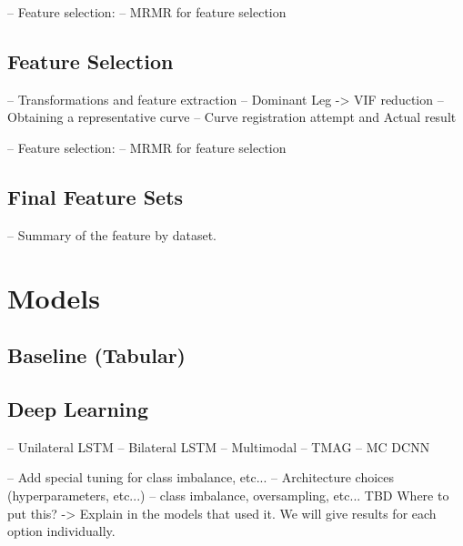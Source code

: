 -- Feature selection:
    -- MRMR for feature selection

\subsection{Feature Selection}\label{subsec:method-feature-selection}
-- Transformations and feature extraction
    -- Dominant Leg -> VIF reduction
    -- Obtaining a representative curve
        -- Curve registration attempt and Actual result

-- Feature selection:
    -- MRMR for feature selection



\subsection{Final Feature Sets}\label{subsec:method-final-feature-sets}
-- Summary of the feature by dataset.

\section{Models}\label{sec:method-models}
\subsection{Baseline (Tabular)}\label{subsec:method-baselines}
\subsection{Deep Learning}\label{subsec:method-deep-learning}
-- Unilateral LSTM
-- Bilateral LSTM
-- Multimodal
-- TMAG
-- MC DCNN

-- Add special tuning for class imbalance, etc...
-- Architecture choices (hyperparameters, etc...)
-- class imbalance, oversampling, etc... TBD Where to put this? -> Explain in the models that used it. We will give results for each option individually.

